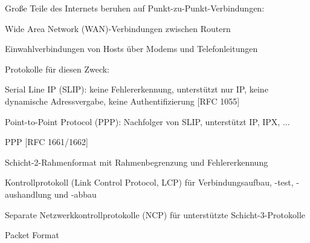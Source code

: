 \documentclass[a4paper]{article}
\begin{document}
\begin{multicols}{3}
      \begin{itemize*}
            \item Große Teile des Internets beruhen auf Punkt-zu-Punkt-Verbindungen:
            \begin{itemize*}
                  \item Wide Area Network (WAN)-Verbindungen zwischen Routern
                  \item Einwahlverbindungen von Hosts über Modems und Telefonleitungen
            \end{itemize*}
            \item Protokolle für diesen Zweck:
            \begin{itemize*}
                  \item Serial Line IP (SLIP): keine Fehlererkennung, unterstützt nur IP, keine dynamische Adressvergabe, keine Authentifizierung {[}RFC 1055{]}
                  \item Point-to-Point Protocol (PPP): Nachfolger von SLIP, unterstützt IP, IPX, ...
            \end{itemize*}
            \item PPP {[}RFC 1661/1662{]}
            \begin{itemize*}
                  \item Schicht-2-Rahmenformat mit Rahmenbegrenzung und Fehlererkennung
                  \item Kontrollprotokoll (Link Control Protocol, LCP) für Verbindungsaufbau, -test, -aushandlung und -abbau
                  \item Separate Netzwerkkontrollprotokolle (NCP) für unterstützte Schicht-3-Protokolle
            \end{itemize*}
      \end{itemize*}

      Packet Format


\end{multicols}
\end{document}
